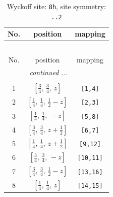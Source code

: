 \documentclass[fleqn,8pt]{jsarticle}
\begin{document}
\begin{longtable}{ccc}
\caption{Wyckoff site: {\tt 8h}, site symmetry: {\tt ..2}}
 \\
 \hline \hline
No. & position & mapping \\ \hline \endfirsthead

\multicolumn{2}{l}{\tablename\ \thetable{}} \\
 \hline \hline
No. & position & mapping \\ \hline \endhead

 \hline \hline
\multicolumn{2}{r}{\footnotesize\it continued ...} \\ \endfoot

 \hline \hline
\multicolumn{2}{r}{} \\ \endlastfoot

1 & $\left[ \frac{3}{4},\, \frac{3}{4},\, z \right]$ & {\tt [1,4]} \\ \hline
2 & $\left[ \frac{1}{4},\, \frac{1}{4},\, \frac{1}{2} - z \right]$ & {\tt [2,3]} \\ \hline
3 & $\left[ \frac{1}{4},\, \frac{1}{4},\, - z \right]$ & {\tt [5,8]} \\ \hline
4 & $\left[ \frac{3}{4},\, \frac{3}{4},\, z + \frac{1}{2} \right]$ & {\tt [6,7]} \\ \hline
5 & $\left[ \frac{1}{4},\, \frac{1}{4},\, z + \frac{1}{2} \right]$ & {\tt [9,12]} \\ \hline
6 & $\left[ \frac{3}{4},\, \frac{3}{4},\, - z \right]$ & {\tt [10,11]} \\ \hline
7 & $\left[ \frac{3}{4},\, \frac{3}{4},\, \frac{1}{2} - z \right]$ & {\tt [13,16]} \\ \hline
8 & $\left[ \frac{1}{4},\, \frac{1}{4},\, z \right]$ & {\tt [14,15]} \\
\end{longtable}
\renewcommand{\arraystretch}{1.2}
\end{document}
